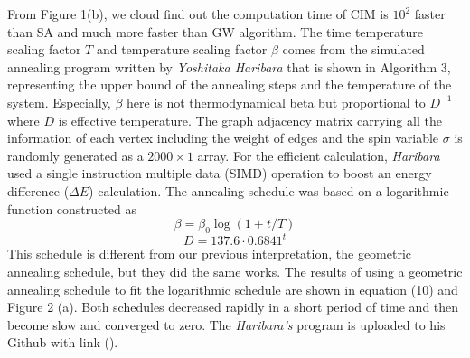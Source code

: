 \documentclass{turabian-researchpaper}
\begin{document}
        From Figure 1(b), we cloud find out the computation time of CIM is $10^{2}$ faster than SA and much more faster than GW algorithm\cite{2016incoherent}. The time temperature scaling factor $T$ and temperature scaling factor $\beta$ comes from the simulated annealing program written by \textit{Yoshitaka Haribara} that is shown in Algorithm 3, representing the upper bound of the annealing steps and the temperature of the system. Especially, $\beta$ here is not thermodynamical beta but proportional to $D^{-1}$ where $D$ is effective temperature. The graph adjacency matrix carrying all the information of each vertex including the weight of edges and the spin variable $\sigma$ is randomly generated as a $2000\times 1$ array. For the efficient calculation, \textit{Haribara} used a single instruction multiple data (SIMD) operation to boost an energy difference ($\Delta E$) calculation\cite{2016incoherent}. The annealing schedule was based on a logarithmic function constructed as
            \begin{equation}
                \beta = \beta_0 \log(1+t/T)
            \end{equation}
            \begin{equation}
                D = 137.6 \cdot 0.6841^t
            \end{equation}
        This schedule is different from our previous interpretation, the geometric annealing schedule, but they did the same works. The results of using a geometric annealing schedule to fit the logarithmic schedule are shown in equation (10) and Figure 2 (a). Both schedules decreased rapidly in a short period of time and then become slow and converged to zero. The \textit{Haribara's} program is uploaded to his Github with link ().
\end{document}
